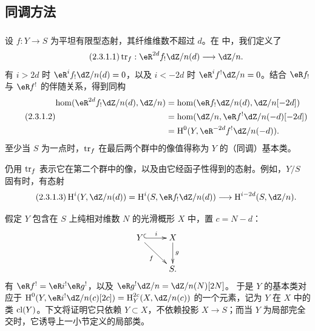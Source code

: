 \subsection{同调方法}\label{IV:2-3}
\subsubsection{}\label{IV:2-3-1}
设 $f:Y\to S$ 为平坦有限型态射，其纤维维数不超过 $d$。在 \cite[XVIII 2.9]{sga4} 中，我们定义了
\begin{equation*}\tag{2.3.1.1}\label{IV:eq:2-3-1-1}
\tr_f:\eR^{2d}f_!\dZ/n(d)\longrightarrow\dZ/n.
\end{equation*}
有 $i>2d$ 时 $\eR^if_!\dZ/n(d)=0$，以及 $i<-2d$ 时 $\eR^if^!\dZ/n=0$。结合 $\eR f_!$ 与 $\eR f^!$ 的伴随关系，得到同构
\begin{equation*}\tag{2.3.1.2}\label{IV:eq:2-1-3-2}
\begin{aligned}
\hom(\eR^{2d}f_!\dZ/n(d),\dZ/n)
&=\hom(\eR f_!\dZ/n(d),\dZ/n[-2d])\\
&=\hom(\dZ/n,\eR f^!\dZ/n(-d)[-2d])\\
&=\h^0(Y,\eR^{-2d}f^!\dZ/n(-d)).
\end{aligned}
\end{equation*}
至少当 $S$ 为一点时，$\operatorname{tr}_f$ 在最后两个群中的像值得称为 $Y$ 的（同调）基本类。

仍用 $\operatorname{tr}_f$ 表示它在第二个群中的像，以及由它经函子性得到的态射。例如，$Y/S$ 固有时，有态射
\begin{equation*}\tag{2.3.1.3}\label{IV:eq:2-3-1-3}
\h^i(Y,\dZ/n(d))=\h^i(S,\eR f_!\dZ/n(d))\longrightarrow\h^{i-2d}(S,\dZ/n).
\end{equation*}

假定 $Y$ 包含在 $S$ 上纯相对维数 $N$ 的光滑概形 $X$ 中，置 $c=N-d$：
\[\xymatrix{Y\ar@{^{(}->}[r]^-i\ar[dr]_-f&X\ar[d]^-g\\&S.}\]
有 $\eR f^!=\eR i^!\eR g^!$，以及 $\eR g^!\dZ/n=\dZ/n(N)[2N]$。
于是 $Y$ 的基本类对应于
$\h^0(Y,\eR i^!\dZ/n(c)[2c])=\h_Y^{2c}(X,\dZ/n(c))$ 的一个元素，记为 $Y$ 在 $X$ 中的类 $\operatorname{cl}(Y)$。下文将证明它只依赖 $Y\subset X$，不依赖投影 $X\to S$；而当 $Y$ 为局部完全交时，它诱导上一小节定义的局部类。

